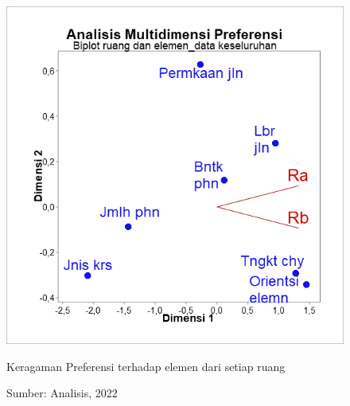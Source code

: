\documentclass[11pt]{simartadv} %
\begin{document}
\begin{figure}[htpb]
    \centering
    \includegraphics[width=\textwidth,trim={.5cm .3cm .5cm .1cm},clip]{figures/bre.png}
    \caption{Keragaman Preferensi terhadap elemen dari setiap ruang}
    \caption*{Sumber: Analisis, 2022}
    \label{fig:bre}
\end{figure}
\end{document}
